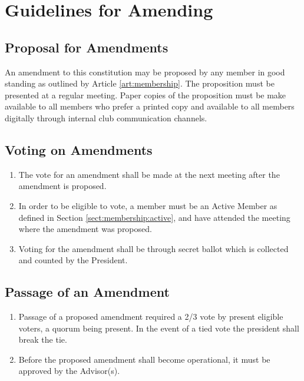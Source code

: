 \documentclass[english,11pt]{article}
\begin{document}
\section{Guidelines for Amending} \label{art:amending}

\subsection{Proposal for Amendments} \label{sect:amending:proposal}
An amendment to this constitution may be proposed by any member in good standing as outlined by Article \ref{art:membership}.
The proposition must be presented at a regular meeting.
Paper copies of the proposition must be make available to all members who prefer a printed copy and available to all members digitally through internal club communication channels.

\subsection{Voting on Amendments}  \label{sect:amending:voting}
\begin{enumerate}[label=\Alph*.]
    \item The vote for an amendment shall be made at the next meeting after the amendment is proposed.
    \item In order to be eligible to vote, a member must be an Active Member as defined in Section \ref{sect:membership:active}, and have attended the meeting where the amendment was proposed.
    \item Voting for the amendment shall be through secret ballot which is collected and counted by the President.
\end{enumerate}

\subsection{Passage of an Amendment} \label{sect:amending:passage}
\begin{enumerate}[label=\Alph*.]
    \item Passage of a proposed amendment required a 2/3 vote by present eligible voters, a quorum being present.
        In the event of a tied vote the president shall break the tie.
    \item Before the proposed amendment shall become operational, it must be approved by the Advisor(s).
\end{enumerate}
\end{document}
